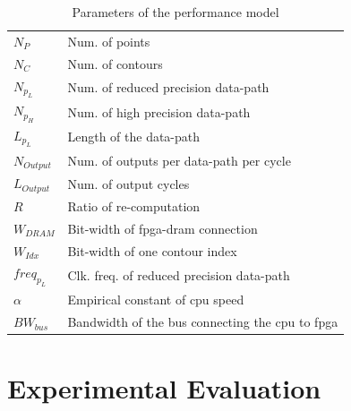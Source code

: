 \begin{table}[t!]
	\begin{spacing}{1.0}
	\caption{Parameters of the performance model}
	\label{tab:model}
	\centering
	\smallskip
	\begin{tabular}{l|l}
			\hline
			$N_P$			& Num. of points \\
			$N_C$			& Num. of contours \\
			$N_{p_L}$ 		& Num. of reduced precision data-path \\
			$N_{p_H}$ 		& Num. of high precision data-path \\
			$L_{p_L}$			& Length of the data-path \\
			$N_{Output}$ 	& Num. of outputs per data-path per cycle \\
			$L_{Output}$ 	& Num. of output cycles \\
			$R$ 			& Ratio of re-computation \\
			$W_{DRAM}$ 		& Bit-width of \gls{fpga}-\gls{dram} connection \\
			$W_{Idx}$ 		& Bit-width of one contour index \\
			$freq_{p_L}$  	& Clk. freq. of reduced precision data-path \\
			$\alpha$ 		& Empirical constant of \gls{cpu} speed \\
			$BW_{bus}$ 	& Bandwidth of the bus connecting the \gls{cpu} to \gls{fpga} \\
			\hline
		\end{tabular}
	\end{spacing}
\end{table}

%


\section{Experimental Evaluation}
\label{sec:evaluation}

